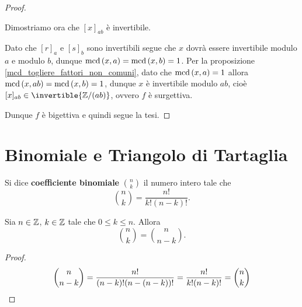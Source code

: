 \begin{proof}
\begin{description}
        Dimostriamo ora che $[x]_{ab}$ è invertibile.
                
        Dato che $[r]_a$ e $[s]_b$ sono invertibili segue che $x$ dovrà essere invertibile modulo $a$ e modulo $b$, dunque $\operatorname{mcd}\left(x, a\right) = \operatorname{mcd}\left(x, b\right) = 1$. Per la proposizione \ref{mcd_togliere_fattori_non_comuni}, dato che $\operatorname{mcd}\left(x, a\right) = 1$ allora $\operatorname{mcd}\left(x, ab\right) = \operatorname{mcd}\left(x, b\right) = 1$, dunque $x$ è invertibile modulo $ab$, cioè $[x]_{ab} \in \invertible{\Z/(ab)}$, ovvero $f$ è surgettiva.
    \end{description}

    Dunque $f$ è bigettiva e quindi segue la tesi.
\end{proof}

\section{Binomiale e Triangolo di Tartaglia}

\begin{definition}
    Si dice \textbf{coefficiente binomiale} $\binom{n}{k}$ il numero intero tale che \begin{equation}
        \binom{n}{k} = \frac{n!}{k!(n-k)!}.
    \end{equation}    
\end{definition}

\begin{proposition}\label{simmetria_binomiale}
    Sia $n \in \mathbb{Z}$, $k \in \mathbb{Z}$ tale che $0 \leq k \leq n$. Allora \begin{equation}
        \binom{n}{k} = \binom{n}{n-k}.
    \end{equation}
\end{proposition}
\begin{proof}
    \[\binom{n}{n - k} = \frac{n!}{(n-k)!(n-(n-k))!} = \frac{n!}{k!(n-k)!} = \binom{n}{k} \qedhere\]
\end{proof}

